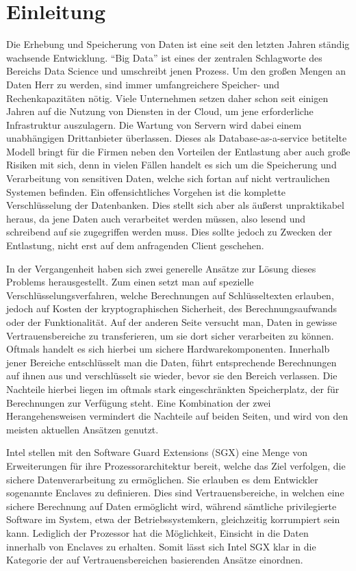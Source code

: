 
\chapter{Einleitung}

Die Erhebung und Speicherung von Daten ist eine seit den letzten Jahren ständig wachsende Entwicklung. "`Big Data"' ist eines der zentralen Schlagworte des Bereichs Data Science und umschreibt jenen Prozess. Um den großen Mengen an Daten Herr zu werden, sind immer umfangreichere Speicher- und Rechenkapazitäten nötig. Viele Unternehmen setzen daher schon seit einigen Jahren auf die Nutzung von Diensten in der Cloud, um jene erforderliche Infrastruktur auszulagern. Die Wartung von Servern wird dabei einem unabhängigen Drittanbieter überlassen. Dieses als Database-as-a-service betitelte Modell bringt für die Firmen neben den Vorteilen der Entlastung aber auch große Risiken mit sich, denn in vielen Fällen handelt es sich um die Speicherung und Verarbeitung von sensitiven Daten, welche sich fortan auf nicht vertraulichen Systemen befinden. Ein offensichtliches Vorgehen ist die komplette Verschlüsselung der Datenbanken. Dies stellt sich aber als äußerst unpraktikabel heraus, da jene Daten auch verarbeitet werden müssen, also lesend und schreibend auf sie zugegriffen werden muss. Dies sollte jedoch zu Zwecken der Entlastung, nicht erst auf dem anfragenden Client geschehen.

In der Vergangenheit haben sich zwei generelle Ansätze zur Lösung dieses Problems herausgestellt. Zum einen setzt man auf spezielle Verschlüsselungsverfahren, welche Berechnungen auf Schlüsseltexten erlauben, jedoch auf Kosten der kryptographischen Sicherheit, des Berechnungsaufwands oder der Funktionalität. Auf der anderen Seite versucht man, Daten in gewisse Vertrauensbereiche zu transferieren, um sie dort sicher verarbeiten zu können. Oftmals handelt es sich hierbei um sichere Hardwarekomponenten. Innerhalb jener Bereiche entschlüsselt man die Daten, führt entsprechende Berechnungen auf ihnen aus und verschlüsselt sie wieder, bevor sie den Bereich verlassen. Die Nachteile hierbei liegen im oftmals stark eingeschränkten Speicherplatz, der für Berechnungen zur Verfügung steht.
Eine Kombination der zwei Herangehensweisen vermindert die Nachteile auf beiden Seiten, und wird von den meisten aktuellen Ansätzen genutzt.
 
Intel stellen mit den Software Guard Extensions (SGX) eine Menge von Erweiterungen für ihre Prozessorarchitektur bereit, welche das Ziel verfolgen, die sichere Datenverarbeitung zu ermöglichen. Sie erlauben es dem Entwickler sogenannte Enclaves zu definieren. Dies sind Vertrauensbereiche, in welchen eine sichere Berechnung auf Daten ermöglicht wird, während sämtliche privilegierte Software im System, etwa der Betriebssystemkern, gleichzeitig korrumpiert sein kann. Lediglich der Prozessor hat die Möglichkeit, Einsicht in die Daten innerhalb von Enclaves zu erhalten. Somit lässt sich Intel SGX klar in die Kategorie der auf Vertrauensbereichen basierenden Ansätze einordnen.

